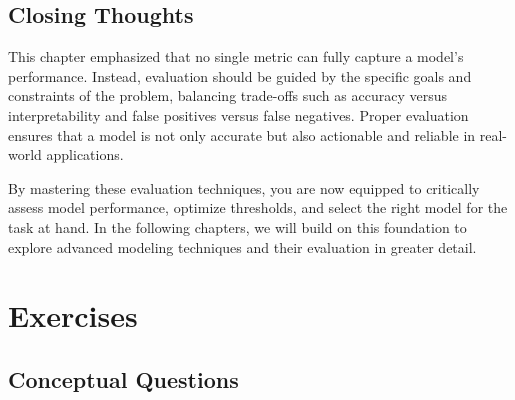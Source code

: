 \documentclass[
]{book}
\theoremstyle{definition}
\theoremstyle{definition}
\theoremstyle{definition}
\theoremstyle{definition}
\theoremstyle{remark}
\begin{document}
\subsection*{Closing Thoughts}\label{closing-thoughts}

This chapter emphasized that no single metric can fully capture a model's performance. Instead, evaluation should be guided by the specific goals and constraints of the problem, balancing trade-offs such as accuracy versus interpretability and false positives versus false negatives. Proper evaluation ensures that a model is not only accurate but also actionable and reliable in real-world applications.

By mastering these evaluation techniques, you are now equipped to critically assess model performance, optimize thresholds, and select the right model for the task at hand. In the following chapters, we will build on this foundation to explore advanced modeling techniques and their evaluation in greater detail.

\section{Exercises}\label{exercises-6}

\subsection*{Conceptual Questions}\label{conceptual-questions-4}
\end{document}
